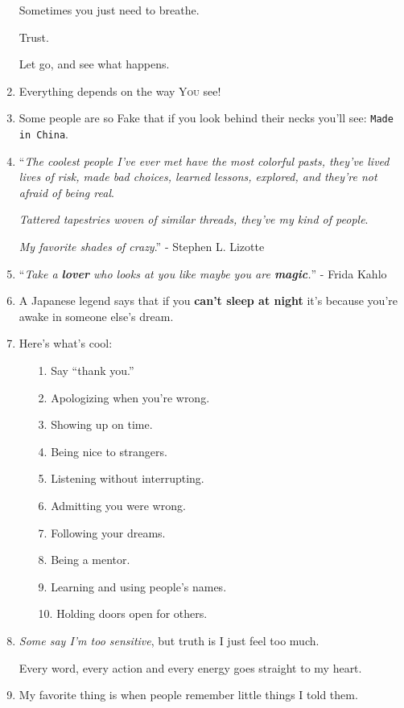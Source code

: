 \documentclass{article}
\numberwithin{equation}{section}
\begin{document}
\begin{enumerate}
    Sometimes you just need to breathe.
    
    Trust.
    
    Let go, and see what happens.
    \item Everything depends on the way \textsc{You} see!
    \item Some people are so Fake that if you look behind their necks you'll see: \texttt{Made in China}.
    \item ``\textit{The coolest people I've ever met have the most colorful pasts, they've lived lives of risk, made bad choices, learned lessons, explored, and they're not afraid of being real}.
    
    \textit{Tattered tapestries woven of similar threads, they've my kind of people}.
    
    \textit{My favorite shades of crazy}.'' - Stephen L. Lizotte
    \item ``\textit{Take a \textbf{lover} who looks at you like maybe you are \textbf{magic}.}'' - Frida Kahlo
    \item A Japanese legend says that if you \textbf{can't sleep at night} it's because you're awake in someone else's dream.
    \item Here's what's cool:
    \begin{itemize}
        \item[1.] Say ``thank you.''
        \item[2.] Apologizing when you're wrong.
        \item[3.] Showing up on time.
        \item[4.] Being nice to strangers.
        \item[5.] Listening without interrupting.
        \item[6.] Admitting you were wrong.
        \item[7.] Following your dreams.
        \item[8.] Being a mentor.
        \item[9.] Learning and using people's names.
        \item[10.] Holding doors open for others.
    \end{itemize}
    \item \textit{Some say I'm too sensitive}, but truth is I just feel too much.
    
    Every word, every action and every energy goes straight to my heart.
    \item My favorite thing is when people remember little things I told them.
    

\end{enumerate}
\end{document}
